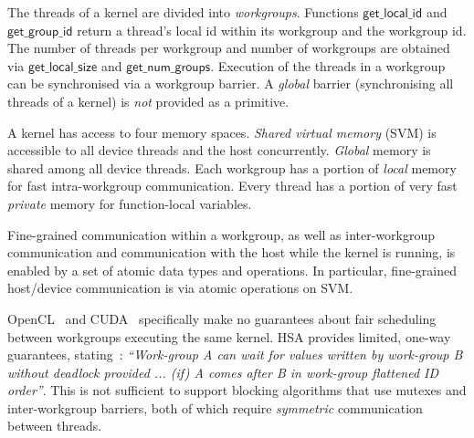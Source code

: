 \documentclass[sigconf]{acmart}
\newcommand{\getgroupid}{\mathsf{get\_group\_id}}
\newcommand{\getnumgroups}{\mathsf{get\_num\_groups}}
\newcommand{\getlocalid}{\mathsf{get\_local\_id}}
\newcommand{\getglobalid}{\mathsf{get\_global\_id}}
\newcommand{\getlocalsize}{\mathsf{get\_local\_size}}
\newcommand{\getglobalsize}{\mathsf{get\_global\_size}}
\begin{document}
The threads of a kernel are divided into \emph{workgroups}.
Functions
$\getlocalid$ and $\getgroupid$ return a thread's local id within
its workgroup and the workgroup id.
%
%
The number
of threads per workgroup and number of workgroups are obtained via
$\getlocalsize$ and $\getnumgroups$.
%
Execution of the threads in a workgroup can be synchronised via a
workgroup barrier.
A \emph{global} barrier (synchronising all
threads of a kernel) is \emph{not} provided as a primitive.

 A kernel has access to
four memory spaces.  \emph{Shared virtual memory} (SVM) is accessible
to all device threads and the host concurrently.  \emph{Global} memory is
shared among all device threads.  Each workgroup has a
portion of \emph{local} memory for fast intra-workgroup communication.
Every thread has a portion of very fast \emph{private} memory for
function-local variables.

Fine-grained
communication within a workgroup, as well as inter-workgroup
communication and communication with the host while the kernel is
running, is enabled by a set of atomic data types and operations.  In
particular, fine-grained host/device communication is via atomic
operations on SVM.

OpenCL~\cite[p.\ 31]{opencl2Spec} and CUDA~\cite{cuda-75} specifically make no guarantees about fair scheduling between
workgroups executing the same kernel.
%
HSA provides limited, one-way guarantees,
stating~\cite[p. 46]{HSAprogramming11}: \emph{``Work-group A can wait
  for values written by work-group B without deadlock provided ... (if) A
  comes after B in work-group flattened ID order''}. This is not sufficient to support blocking algorithms that use
mutexes and inter-workgroup barriers, both of which require \emph{symmetric} communication between
threads.
\end{document}
